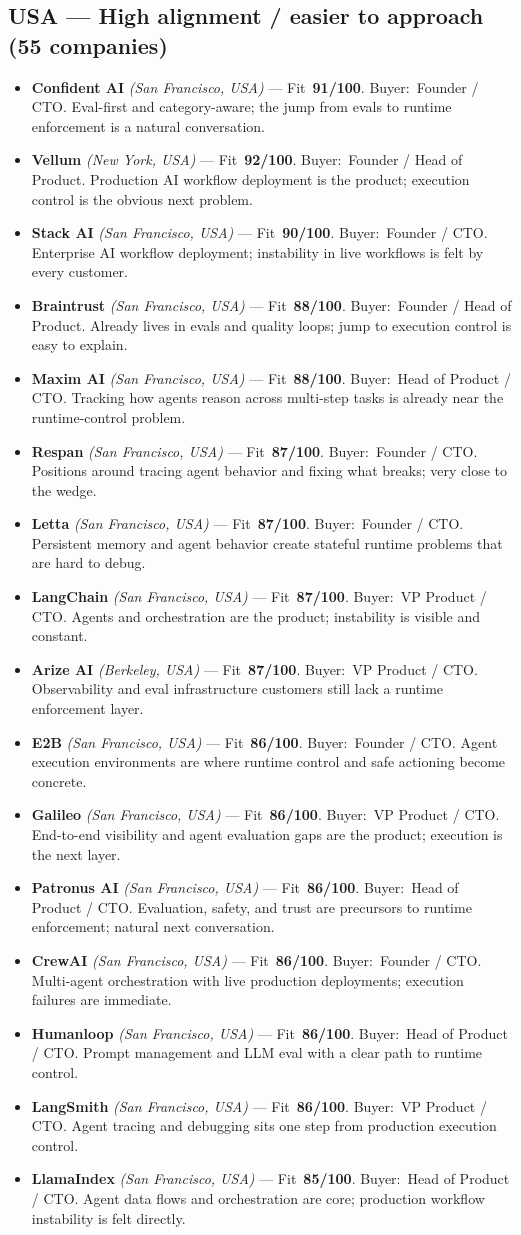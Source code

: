 \documentclass[10pt]{article}
\newcommand{\cand}[5]{\item \textbf{#1} \textit{(#2)} --- Fit~\textbf{#3/100}. Buyer:~#4. #5}
\newcommand{\topcand}[5]{\item \textcolor{green!50!black}{\textbf{#1} \textit{(#2)}} --- Fit~\textbf{#3/100}. Buyer:~#4. #5}
\begin{document}
\subsection{USA --- High alignment / easier to approach (55 companies)}
\begin{itemize}
\topcand{Confident AI}{San Francisco, USA}{91}{Founder / CTO}{Eval-first and category-aware; the jump from evals to runtime enforcement is a natural conversation.}
\topcand{Vellum}{New York, USA}{92}{Founder / Head of Product}{Production AI workflow deployment is the product; execution control is the obvious next problem.}
\topcand{Stack AI}{San Francisco, USA}{90}{Founder / CTO}{Enterprise AI workflow deployment; instability in live workflows is felt by every customer.}
\topcand{Braintrust}{San Francisco, USA}{88}{Founder / Head of Product}{Already lives in evals and quality loops; jump to execution control is easy to explain.}
\topcand{Maxim AI}{San Francisco, USA}{88}{Head of Product / CTO}{Tracking how agents reason across multi-step tasks is already near the runtime-control problem.}
\cand{Respan}{San Francisco, USA}{87}{Founder / CTO}{Positions around tracing agent behavior and fixing what breaks; very close to the wedge.}
\cand{Letta}{San Francisco, USA}{87}{Founder / CTO}{Persistent memory and agent behavior create stateful runtime problems that are hard to debug.}
\cand{LangChain}{San Francisco, USA}{87}{VP Product / CTO}{Agents and orchestration are the product; instability is visible and constant.}
\cand{Arize AI}{Berkeley, USA}{87}{VP Product / CTO}{Observability and eval infrastructure customers still lack a runtime enforcement layer.}
\cand{E2B}{San Francisco, USA}{86}{Founder / CTO}{Agent execution environments are where runtime control and safe actioning become concrete.}
\cand{Galileo}{San Francisco, USA}{86}{VP Product / CTO}{End-to-end visibility and agent evaluation gaps are the product; execution is the next layer.}
\cand{Patronus AI}{San Francisco, USA}{86}{Head of Product / CTO}{Evaluation, safety, and trust are precursors to runtime enforcement; natural next conversation.}
\cand{CrewAI}{San Francisco, USA}{86}{Founder / CTO}{Multi-agent orchestration with live production deployments; execution failures are immediate.}
\cand{Humanloop}{San Francisco, USA}{86}{Head of Product / CTO}{Prompt management and LLM eval with a clear path to runtime control.}
\cand{LangSmith}{San Francisco, USA}{86}{VP Product / CTO}{Agent tracing and debugging sits one step from production execution control.}
\cand{LlamaIndex}{San Francisco, USA}{85}{Head of Product / CTO}{Agent data flows and orchestration are core; production workflow instability is felt directly.}

\end{itemize}
\end{document}
